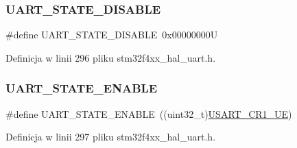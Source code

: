 \subsubsection{\texorpdfstring{U\+A\+R\+T\+\_\+\+S\+T\+A\+T\+E\+\_\+\+D\+I\+S\+A\+B\+LE}{UART\_STATE\_DISABLE}}
{\footnotesize\ttfamily \#define U\+A\+R\+T\+\_\+\+S\+T\+A\+T\+E\+\_\+\+D\+I\+S\+A\+B\+LE~0x00000000U}



Definicja w linii 296 pliku stm32f4xx\+\_\+hal\+\_\+uart.\+h.

\mbox{\label{group___u_a_r_t___state_gab6b470dccef2a518a45554b171acff5b}} 
\subsubsection{\texorpdfstring{U\+A\+R\+T\+\_\+\+S\+T\+A\+T\+E\+\_\+\+E\+N\+A\+B\+LE}{UART\_STATE\_ENABLE}}
{\footnotesize\ttfamily \#define U\+A\+R\+T\+\_\+\+S\+T\+A\+T\+E\+\_\+\+E\+N\+A\+B\+LE~((uint32\+\_\+t)\hyperlink{group___peripheral___registers___bits___definition_ga2bb650676aaae4a5203f372d497d5947}{U\+S\+A\+R\+T\+\_\+\+C\+R1\+\_\+\+UE})}



Definicja w linii 297 pliku stm32f4xx\+\_\+hal\+\_\+uart.\+h.

